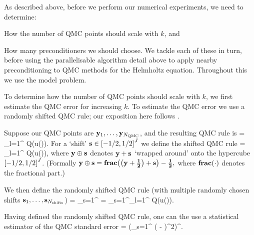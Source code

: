 As described above, before we perform our numerical experiments, we need to determine:
\bit
\item How the number of QMC points should scale with $k$, and
  \item How many preconditioners we should choose.
    \eit
    We tackle each of these in turn, before using the parallelisable algorithm detail above to apply nearby preconditioning to QMC methods for the Helmholtz equation. Throughout this  we use the model problem.

    To determine how the number of QMC points should scale with $k$, we first estimate the QMC error for increasing $k.$ To estimate the QMC error we use a randomly shifted QMC rule; our exposition here follows \cite[Section 4.2]{GrKuNuScSl:11}.

    Suppose our QMC points are $\mathbf{y}_{1},\ldots,\mathbf{y}_{N_{\mathrm{QMC}}}$, and the resulting QMC rule is
    \beqs
{} = \sum_{l=1}^{\NQMC} Q\mleft(u\mleft(\byl\mright)\mright).
\eeqs
For a `shift' $\shift \in \cube{J}$ we define the shifted QMC rule
\beqs
{} = \sum_{l=1}^{\NQMC} Q\mleft(u\mleft(\byl\oplus\shift\mright)\mright),
\eeqs
where $\mathbf{y} \oplus \mathbf{s}$ denotes $\mathbf{y} + \mathbf{s}$ `wrapped around' onto the hypercube $\cube{J}$. (Formally $\by \oplus \shift = \fracoperator{\mleft(\by + \bhalf\mright)+\shift} - \bhalf,$ where $\fracoperator{\cdot}$ denotes the fractional part.)

We then define the randomly shifted QMC rule (with multiple randomly chosen shifts $\mathbf{s}_{1},\ldots,\mathbf{s}_{N_{\mathrm{shifts}}}$)
\beqs
{} = \sum_{s=1}^{\Nshifts}  = \sum_{s=1}^{\Nshifts}\sum_{l=1}^{\NQMC} Q\mleft(u\mleft(\byl\oplus \shifts\mright)\mright).
\eeqs

Having defined the randomly shifted QMC rule, one can the use a statistical estimator of the QMC standard error \cite[Equation (4.6)]{GrKuNuScSl:11}
\beqs
\QMCerror{\NQMC}{\Nshifts} = \mleft(\sum_{s=1}^{\Nshifts} \mleft( - \mright)^2\mright)^{\half}.
\eeqs


